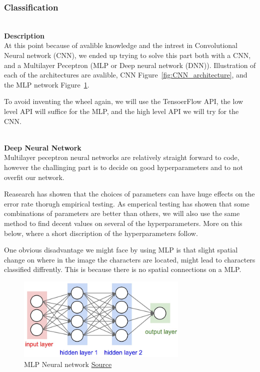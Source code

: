\documentclass[11pt,a4paper,UKenglish]{article}
\begin{document}
\subsubsection{Classification}
\noindent \\ \textbf{Description}
\noindent \\ At this point because of avalible knowledge and the intrest in
Convolutional Neural network (CNN), we ended up trying to solve this part
both with a CNN, and a Multilayer Peceptron (MLP or Deep neural network (DNN)).
Illustration of each of the architectures are avalible, CNN Figure~\ref{fig:CNN_architecture},
and the MLP network Figure~\ref{fig:neural_net2}. \par
To avoid inventing the wheel again, we will use the TensoerFlow API, the low
level API will suffice for the MLP, and the high level API we will try for the
CNN.

\noindent \\ \textbf{Deep Neural Network}
\noindent \\ Multilayer peceptron neural networks are relatively straight
forward to code, however the challinging part is to decide on good
hyperparameters and to not overfit our network. \par
Reasearch has showen that the choices of parameters can have huge effects on
the error rate thorugh empirical testing. As emperical testing has showen that
some combinations of parameters are better than others, we will also use the
same method to find decent values on several of the hyperparameters. More on
this below, where a short discription of the hyperparameters follow. \par
One obvious disadvantage we might face by using MLP is that slight spatial
change on where in the image the characters are located, might lead to
characters classified diffrently. This is because there is no spatial
connections on a MLP.

\begin{figure}[H]
  \centering
  \includegraphics[height=4cm]{res/neural_net2.jpeg}
  \caption{MLP Neural network \href{http://cs231n.github.io/neural-networks-1/}{Source}}
  \label{fig:neural_net2}
\end{figure}
\end{document}

